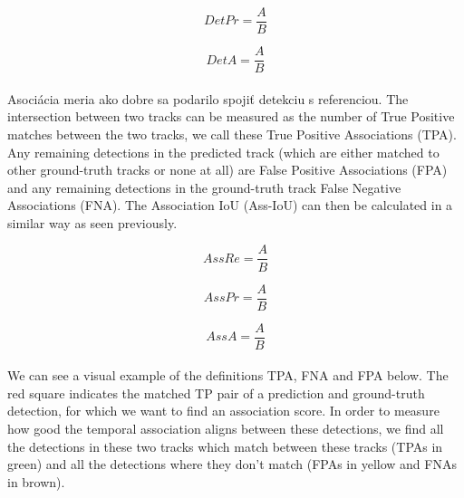 \begin{equation}
DetPr = \frac{A}{B}
\label{e:DetPr}
\end{equation}

\begin{equation}
DetA = \frac{A}{B}
\label{e:DetA}
\end{equation}
\endgroup
\\
Asociácia meria ako dobre sa podarilo spojiť detekciu s referenciou.  The intersection between two tracks can be measured as the number of True Positive matches between the two tracks, we call these True Positive Associations (TPA). Any remaining detections in the predicted track (which are either matched to other ground-truth tracks or none at all) are False Positive Associations (FPA) and any remaining detections in the ground-truth track False Negative Associations (FNA). The Association IoU (Ass-IoU) can then be calculated in a similar way as seen previously.

\begingroup
\large
\begin{equation}
AssRe = \frac{A}{B}
\label{e:AssRe}
\end{equation}

\begin{equation}
AssPr = \frac{A}{B}
\label{e:AssPr}
\end{equation}

\begin{equation}
AssA = \frac{A}{B}
\label{e:AssA}
\end{equation}
\endgroup
\\
We can see a visual example of the definitions TPA, FNA and FPA below. The red square indicates the matched TP pair of a prediction and ground-truth detection, for which we want to find an association score. In order to measure how good the temporal association aligns between these detections, we find all the detections in these two tracks which match between these tracks (TPAs in green) and all the detections where they don’t match (FPAs in yellow and FNAs in brown).


